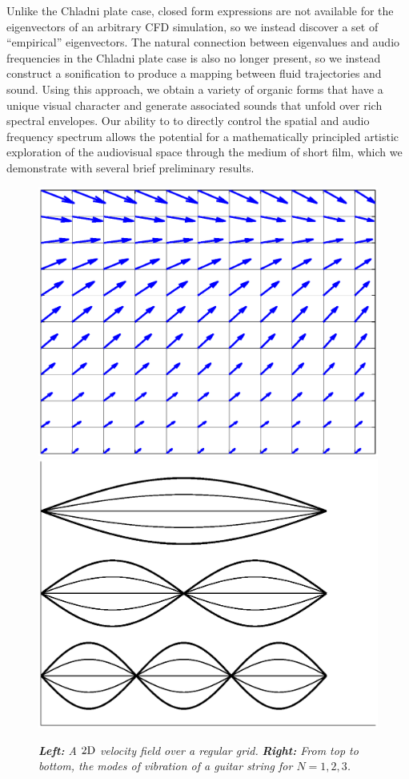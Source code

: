 Unlike the Chladni plate case, closed form expressions are not available for the eigenvectors of an arbitrary CFD simulation, so we instead discover a set of ``empirical'' eigenvectors. The natural connection between eigenvalues and audio frequencies in the Chladni plate case is also no longer present, so we instead construct a sonification to produce a mapping between fluid trajectories and sound. Using this approach, we obtain a variety of organic forms that have a unique visual character and generate associated sounds that unfold over rich spectral envelopes. Our ability to to directly control the spatial and audio frequency spectrum allows the potential for a mathematically principled artistic exploration of the audiovisual space through the medium of short film, which we demonstrate with several brief preliminary results.




\begin{figure}[H]
		\centering
		\includegraphics[height=0.3\textwidth]{chap5/figures/velocity_2d.eps}
		\includegraphics[height=0.3\textwidth]{chap5/figures/guitar_modes.eps}
		\caption{{\em{\bf Left:} A $2\textnormal{D}$ velocity field over a regular grid.} {\em{\bf Right:} From top to bottom, the modes of vibration of a guitar string for $N=1, 2, 3$.}}
		\label{fig:velocity-field}
\end{figure}

